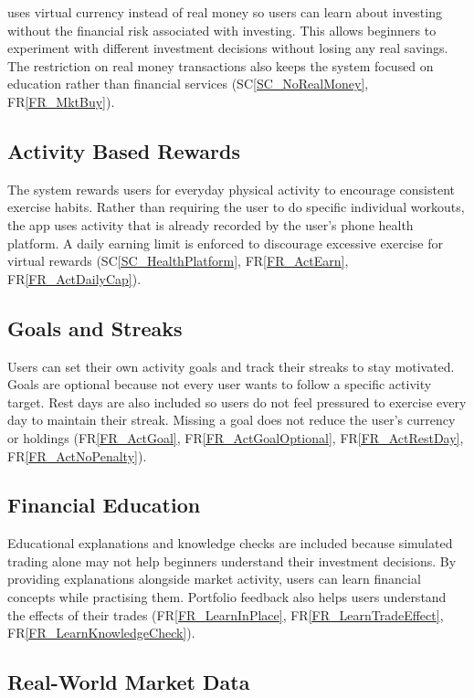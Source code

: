 \documentclass[12pt]{article}
\newcommand{\rref}[1]{FR\ref{#1}}
\newcommand{\scref}[1]{SC\ref{#1}}
\begin{document}
\progname{} uses virtual currency instead of real money so users
can learn about investing without the financial risk associated with investing. This allows
beginners to experiment with different investment decisions
without losing any real savings. The restriction on real money
transactions also keeps the system focused on education rather
than financial services (\scref{SC_NoRealMoney},
\rref{FR_MktBuy}).

\subsection{Activity Based Rewards}

The system rewards users for everyday physical activity to
encourage consistent exercise habits. Rather than requiring the user to do
specific individual workouts, the app uses activity that is already recorded by
the user's phone health platform. A daily earning limit is
enforced to discourage excessive exercise for virtual
rewards (\scref{SC_HealthPlatform},
\rref{FR_ActEarn}, \rref{FR_ActDailyCap}).

\subsection{Goals and Streaks}

Users can set their own activity goals and track their streaks
to stay motivated. Goals are optional because not every user
wants to follow a specific activity target. Rest days are also
included so users do not feel pressured to exercise every day
to maintain their streak. Missing a goal does not reduce
the user's currency or holdings
(\rref{FR_ActGoal}, \rref{FR_ActGoalOptional},
\rref{FR_ActRestDay}, \rref{FR_ActNoPenalty}).

\subsection{Financial Education}

Educational explanations and knowledge checks are included
because simulated trading alone may not help beginners
understand their investment decisions. By providing explanations
alongside market activity, users can learn financial concepts
while practising them. Portfolio feedback also helps users
understand the effects of their trades
(\rref{FR_LearnInPlace},
\rref{FR_LearnTradeEffect},
\rref{FR_LearnKnowledgeCheck}).

\subsection{Real-World Market Data}
\end{document}
